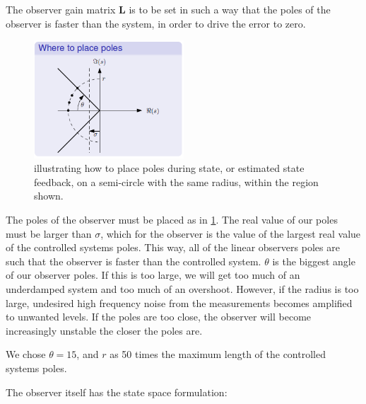 The observer gain matrix $\bm{L}$ is to be set in such a way that the
poles of the observer is faster than the system, in order to drive the
error to zero.
\begin{figure}[H]
  \caption{ illustrating how to place poles during state, or estimated
    state feedback, on a semi-circle with the same radius, within the
    region shown.}
  \label{fig:pole_placement}
  \begin{center}
    \includegraphics[width=0.5\textwidth]{images/pole_placement}
  \end{center}
\end{figure}
The
poles of the observer must be placed as in
\cref{fig:pole_placement}. The real value of our poles must be larger
than $\sigma$, which for the observer is the value of the largest real
value of the controlled systems poles. This way, all of the linear
observers poles are such that the observer is faster than the controlled system. $\theta$ is the
biggest angle of our observer poles. If this is too large, we will get
too much of an underdamped system and too much of an
overshoot. However, if the radius is too large, undesired high
frequency noise from the measurements becomes amplified to unwanted
levels. If the poles are too close, the observer will become increasingly unstable the closer the poles are.

We chose $\theta = 15$, and $r$ as 50 times the maximum length of the
controlled systems poles.

The observer itself has the state space formulation:

